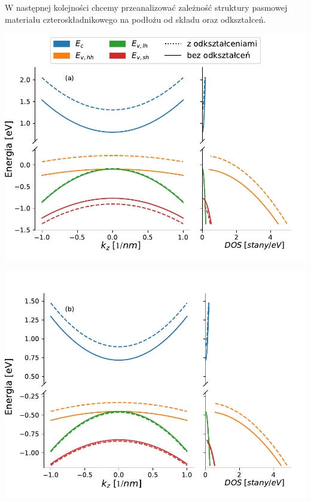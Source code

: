 \documentclass[12pt,openany,a4paper]{book}
\begin{document}
W następnej kolejności chcemy przeanalizować zależność struktury pasmowej
materiału czteroskładnikowego na podłożu  od składu oraz odkształceń.

\begin{minipage}[t]{0.5\textwidth}
	\includegraphics[width = 1.05\linewidth]{Figures/band_str/good/ns_x_0.1_y_0.1.pdf}\label{fig:bs_x_0.1_y_0.1_ns}
\end{minipage}
\begin{minipage}[t]{0.5\textwidth}
	\includegraphics[width = 1.05\linewidth]{Figures/band_str/good/ns_x_0.1_y_0.7.pdf}\label{fig:bs_x_0.1_y_0.7_ns}
\end{minipage}
\end{document}
